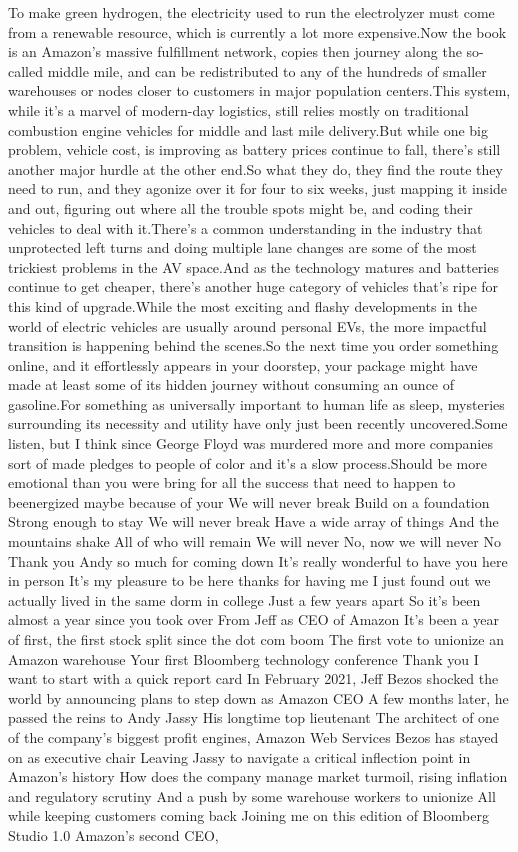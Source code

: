 \documentclass{article}%
\begin{document}
To make green hydrogen, the electricity used to run the electrolyzer must come from a renewable resource, which is currently a lot more expensive.Now the book is an Amazon's massive fulfillment network, copies then journey along the so{-}called middle mile, and can be redistributed to any of the hundreds of smaller warehouses or nodes closer to customers in major population centers.This system, while it's a marvel of modern{-}day logistics, still relies mostly on traditional combustion engine vehicles for middle and last mile delivery.But while one big problem, vehicle cost, is improving as battery prices continue to fall, there's still another major hurdle at the other end.So what they do, they find the route they need to run, and they agonize over it for four to six weeks, just mapping it inside and out, figuring out where all the trouble spots might be, and coding their vehicles to deal with it.There's a common understanding in the industry that unprotected left turns and doing multiple lane changes are some of the most trickiest problems in the AV space.And as the technology matures and batteries continue to get cheaper, there's another huge category of vehicles that's ripe for this kind of upgrade.While the most exciting and flashy developments in the world of electric vehicles are usually around personal EVs, the more impactful transition is happening behind the scenes.So the next time you order something online, and it effortlessly appears in your doorstep, your package might have made at least some of its hidden journey without consuming an ounce of gasoline.For something as universally important to human life as sleep, mysteries surrounding its necessity and utility have only just been recently uncovered.Some listen, but I think since George Floyd was murdered more and more companies sort of made pledges to people of color and it's a slow process.Should be more emotional than you were bring for all the success that need to happen to beenergized maybe because of your We will never break Build on a foundation Strong enough to stay We will never break Have a wide array of things And the mountains shake All of who will remain We will never No, now we will never No Thank you Andy so much for coming down It's really wonderful to have you here in person It's my pleasure to be here thanks for having me I just found out we actually lived in the same dorm in college Just a few years apart So it's been almost a year since you took over From Jeff as CEO of Amazon It's been a year of first, the first stock split since the dot com boom The first vote to unionize an Amazon warehouse Your first Bloomberg technology conference Thank you I want to start with a quick report card In February 2021, Jeff Bezos shocked the world by announcing plans to step down as Amazon CEO A few months later, he passed the reins to Andy Jassy His longtime top lieutenant The architect of one of the company's biggest profit engines, Amazon Web Services Bezos has stayed on as executive chair Leaving Jassy to navigate a critical inflection point in Amazon's history How does the company manage market turmoil, rising inflation and regulatory scrutiny And a push by some warehouse workers to unionize All while keeping customers coming back Joining me on this edition of Bloomberg Studio 1.0 Amazon's second CEO, 
\end{document}
